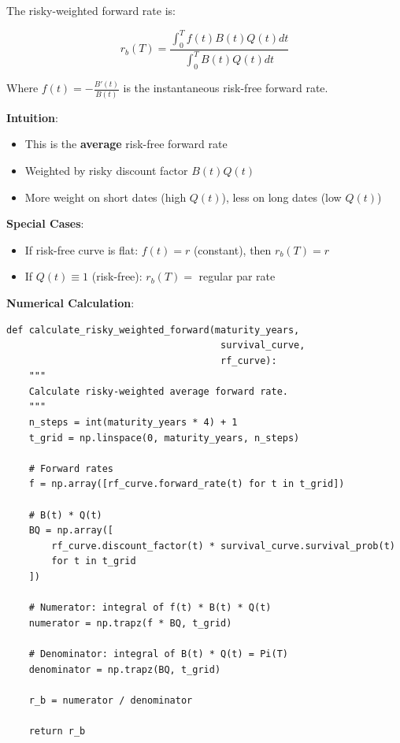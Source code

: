 \documentclass[11pt,a4paper]{article}
\begin{document}
\begin{implbox}
The risky-weighted forward rate is:

\begin{equation}
r_b(T) = \frac{\int_0^T f(t)B(t)Q(t)dt}{\int_0^T B(t)Q(t)dt}
\end{equation}

Where $f(t) = -\frac{B'(t)}{B(t)}$ is the instantaneous risk-free forward rate.

\textbf{Intuition}:
\begin{itemize}
    \item This is the \textbf{average} risk-free forward rate
    \item Weighted by risky discount factor $B(t)Q(t)$
    \item More weight on short dates (high $Q(t)$), less on long dates (low $Q(t)$)
\end{itemize}

\textbf{Special Cases}:
\begin{itemize}
    \item If risk-free curve is flat: $f(t) = r$ (constant), then $r_b(T) = r$
    \item If $Q(t) \equiv 1$ (risk-free): $r_b(T) = $ regular par rate
\end{itemize}

\textbf{Numerical Calculation}:
\begin{lstlisting}
def calculate_risky_weighted_forward(maturity_years, 
                                      survival_curve, 
                                      rf_curve):
    """
    Calculate risky-weighted average forward rate.
    """
    n_steps = int(maturity_years * 4) + 1
    t_grid = np.linspace(0, maturity_years, n_steps)
    
    # Forward rates
    f = np.array([rf_curve.forward_rate(t) for t in t_grid])
    
    # B(t) * Q(t)
    BQ = np.array([
        rf_curve.discount_factor(t) * survival_curve.survival_prob(t)
        for t in t_grid
    ])
    
    # Numerator: integral of f(t) * B(t) * Q(t)
    numerator = np.trapz(f * BQ, t_grid)
    
    # Denominator: integral of B(t) * Q(t) = Pi(T)
    denominator = np.trapz(BQ, t_grid)
    
    r_b = numerator / denominator
    
    return r_b
\end{lstlisting}
\end{implbox}
\end{document}
